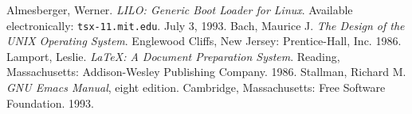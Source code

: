 \begin{thebibliography}{9}
 Almesberger, Werner. {\em LILO: Generic Boot Loader
for Linux}. Available electronically: {\tt tsx-11.mit.edu}. July 3,
1993.
 Bach, Maurice J\@. {\em The Design of the UNIX
Operating System}. Englewood Cliffs, New Jersey: Prentice-Hall, Inc.
1986.
 Lamport, Leslie. {\em \LaTeX: A Document
Preparation System}. Reading, Massachusetts: Addison-Wesley Publishing
Company. 1986.
 Stallman, Richard M\@. {\em GNU Emacs Manual},
eight edition. Cambridge, Massachusetts: Free Software Foundation. 1993.
\end{thebibliography}

